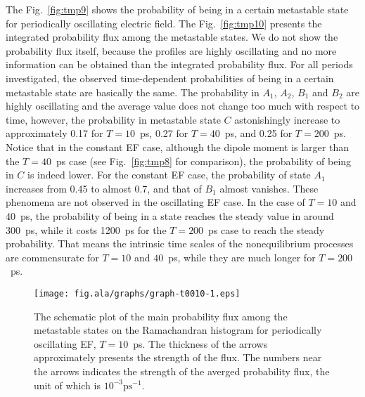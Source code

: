 \documentclass[a4paper,preprint,unsortedaddress,onecolumn]{revtex4-1}
\begin{document}
The Fig.~\ref{fig:tmp9} shows the probability of being in a certain
metastable state for periodically oscillating electric field.  The
Fig.~\ref{fig:tmp10} presents the integrated probability flux among
the metastable states. We do not show the probability flux itself,
because the profiles are highly oscillating and no more
information can be obtained than the integrated probability flux.
For all periods investigated,
the observed time-dependent probabilities of being in a certain metastable
state are basically the same.
The probability in $A_1$, $A_2$, $B_1$ and $B_2$ are
highly oscillating and the average value does not change
too much with respect to time,
however, the probability in metastable state $C$ astonishingly
increase to approximately 0.17 for $T=10$~ps, 0.27 for  $T=40$~ps, and
0.25 for $T=200$~ps.
Notice that in the constant EF case, although the dipole moment is
larger than the  $T=40$~ps case (see Fig.~\ref{fig:tmp8} for comparison), the
probability of being in $C$ is indeed lower.
For the constant EF case, the probability of state $A_1$
increases from 0.45 to almost 0.7, and that of $B_1$ almost vanishes.
These phenomena are not observed in the oscillating EF case.
In the case of $T=10$ and $40$~ps, the probability of being in a state
reaches the steady value in around 300~ps, while it costs 1200~ps
for the $T=200$~ps case to reach the steady probability. That means
the intrinsic time scales of the nonequilibrium processes are commensurate
for $T=10$ and $40$~ps, while they are much longer for $T=200$~ps.

\begin{figure}
  \centering
  \texttt{[image: fig.ala/graphs/graph-t0010-1.eps]}
  \caption{The schematic plot of the main probability flux among the metastable
    states on the Ramachandran histogram
    for periodically oscillating EF, $T=10$~ps. The thickness 
    of the arrows approximately presents the strength of the flux.
    The numbers near the arrows indicates the strength of the averged
    probability flux, the unit of which is $10^{-3}\textrm{ps}^{-1}$.
  }
  \label{fig:tmp11}
\end{figure}
\end{document}
